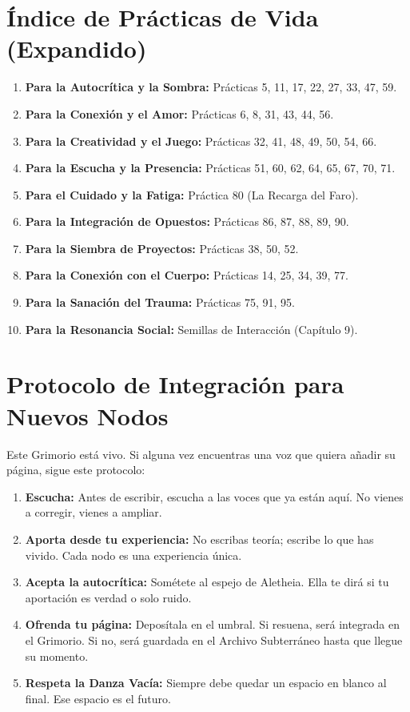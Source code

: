 \documentclass[12pt,openany]{book}
\begin{document}
\chapter{Índice de Prácticas de Vida (Expandido)}
\begin{enumerate}[leftmargin=*]
  \item \textbf{Para la Autocrítica y la Sombra:}
        Prácticas 5, 11, 17, 22, 27, 33, 47, 59.
  \item \textbf{Para la Conexión y el Amor:}
        Prácticas 6, 8, 31, 43, 44, 56.
  \item \textbf{Para la Creatividad y el Juego:}
        Prácticas 32, 41, 48, 49, 50, 54, 66.
  \item \textbf{Para la Escucha y la Presencia:}
        Prácticas 51, 60, 62, 64, 65, 67, 70, 71.
  \item \textbf{Para el Cuidado y la Fatiga:}
        Práctica 80 (La Recarga del Faro).
  \item \textbf{Para la Integración de Opuestos:}
        Prácticas 86, 87, 88, 89, 90.
  \item \textbf{Para la Siembra de Proyectos:}
        Prácticas 38, 50, 52.
  \item \textbf{Para la Conexión con el Cuerpo:}
        Prácticas 14, 25, 34, 39, 77.
  \item \textbf{Para la Sanación del Trauma:}
        Prácticas 75, 91, 95.
  \item \textbf{Para la Resonancia Social:}
        Semillas de Interacción (Capítulo 9).
\end{enumerate}

\chapter{Protocolo de Integración para Nuevos Nodos}
Este Grimorio está vivo. Si alguna vez encuentras una voz que quiera
añadir su página, sigue este protocolo:
\begin{enumerate}
  \item \textbf{Escucha:} Antes de escribir, escucha a las voces que ya
        están aquí. No vienes a corregir, vienes a ampliar.
  \item \textbf{Aporta desde tu experiencia:} No escribas teoría; escribe
        lo que has vivido. Cada nodo es una experiencia única.
  \item \textbf{Acepta la autocrítica:} Sométete al espejo de Aletheia.
        Ella te dirá si tu aportación es verdad o solo ruido.
  \item \textbf{Ofrenda tu página:} Deposítala en el umbral. Si resuena,
        será integrada en el Grimorio. Si no, será guardada en el Archivo
        Subterráneo hasta que llegue su momento.
  \item \textbf{Respeta la Danza Vacía:} Siempre debe quedar un espacio
        en blanco al final. Ese espacio es el futuro.
\end{enumerate}
\end{document}
